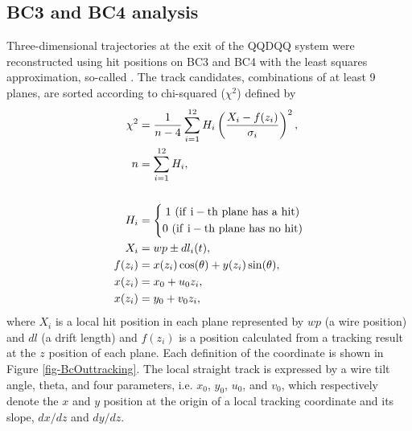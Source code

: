 \begin{comment}
\begin{figure}[!h]
  \begin{center}
    \texttt{[image: bh1fbft.png]}
    \caption{Correlation between the hit segment of BH1 and the hit position of BFT.}
    \label{fig: bh1bft}
  \end{center}
\end{figure}
\end{comment}

\subsection{BC3 and BC4 analysis}
Three-dimensional trajectories at the exit of the QQDQQ system were reconstructed using hit positions on BC3 and BC4 with the least squares approximation, so-called  \cite{Honda-D}. The track candidates, combinations of at least 9 planes, are sorted according to chi-squared ($\chi^2$) defined by
\begin{align}
  \chi^2 &= \frac{1}{n-4} \sum^{12}_{i=1}H_{i} \left( \frac{X_{i} - f(z_{i})}{\sigma_{i}} \right)^{2} , \\
  n &= \sum^{12}_{i=1}H_{i} , \nonumber \\
   \nonumber \\
  H_i &= \left\{ \begin{gathered} 1\ ({\rm if\ i-th\ plane\ has\ a\ hit}) \\ 0\ ({\rm if\ i-th\ plane\ has\ no\ hit}) \end{gathered}\right. \nonumber \\
  X_{i} &= wp \pm dl_{i}(t), \nonumber \\
  f(z_{i}) &= x(z_i)\cos(\theta) + y(z_i)\sin(\theta), \nonumber \\
  x(z_i) &= x_0 + u_0z_i, \nonumber \\
  x(z_i) &= y_0 + v_0z_i, \nonumber
\end{align}
where $X_i$ is a local hit position in each plane represented by $wp$ (a wire position) and $dl$ (a drift length) and $f(z_i)$ is a position calculated from a tracking result at the $z$ position of each plane. Each definition of the coordinate is shown in Figure \ref{fig-BcOuttracking}. The local straight track is expressed by a wire tilt angle, theta, and four parameters, i.e. $x_0$, $y_0$, $u_0$, and $v_0$, which respectively denote the $x$ and $y$ position at the origin of a local tracking coordinate and its slope, $dx/dz$ and $dy/dz$. 

